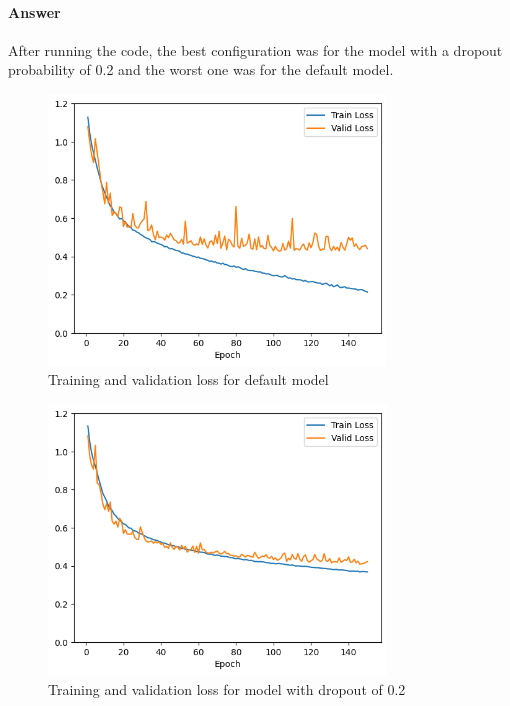 \documentclass{article}
\begin{document}
\paragraph{Answer} After running the code, the best configuration was for the model with a dropout probability of 0.2 and the worst one was for the default model.

\begin{figure}[H]
    \centering
    \includegraphics[width=0.8\textwidth]{"plots/mlp-training-loss-batch-256-lr-0.1-epochs-150-hidden-200-dropout-0.0-l2-0-layers-2-act-relu-opt-sgd.png"}
    \caption{Training and validation loss for default model}
    \label{2.2c default model}
\end{figure}

\begin{figure}[H]
    \centering
    \includegraphics[width=0.8\textwidth]{"plots/mlp-training-loss-batch-256-lr-0.1-epochs-150-hidden-200-dropout-0.2-l2-0-layers-2-act-relu-opt-sgd.png"}
    \caption{Training and validation loss for model with dropout of 0.2}
    \label{2.2c dropout 0.2}
\end{figure}
\end{document}

